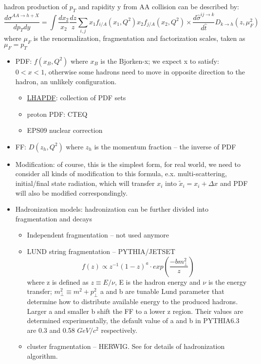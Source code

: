 hadron production of $p_T$ and rapidity y from AA collision can be described by:
\begin{equation*}
\frac{d\sigma^{AA\rightarrow h + X}}{dp_T dy} = 
    \int \frac{dx_2}{x_2}\frac{dz}{z} \sum_{i,j}x_1 f_{i/A}(x_1, Q^2)x_2 f_{j/A}(x_2, Q^2)
    \times \frac{d\hat{\sigma}^{ij\rightarrow k}}{d\hat{t}}D_{k\rightarrow h}(z, \mu_F^2)
\end{equation*}
where $\mu_F$ is the renormalization, fragmentation and factorization scales,
taken as $\mu_F = p_T$
\begin{itemize}
    \item PDF: $f(x_B, Q^2)$ where $x_B$ is the Bjorken-x; we expect x to satisfy:
	$ 0 < x < 1$, otherwise some hadrons need to move in opposite direction
	to the hadron, an unlikely configuration.
	\begin{itemize}
	    \item \href{https://lhapdf.hepforge.org/pdfsets.html}{LHAPDF}: 
		collection of PDF sets
	    \item proton PDF: CTEQ
	    \item EPS09 nuclear correction
	\end{itemize}
    \item FF: $D(z_h, Q^2)$ where $z_h$ is the momentum fraction -- the inverse
	of PDF
    \item Modification: of course, this is the simplest form, for real world,
	we need to consider all kinds of modification to this formula, e.x. 
	multi-scattering, initial/final state radiation, which will transfer
	$x_i$ into $\tilde{x}_i = x_i + \Delta x$ and PDF will also be 
	modified correspondingly.
    \item Hadronization models: hadronization can be further divided into 
	fragmentation and decays
	\begin{itemize}
	    \item Independent fragmentation -- not used anymore
	    \item LUND string fragmentation -- PYTHIA/JETSET
		$$ f(z) \propto z^{-1}(1-z)^a \cdot exp\left( \frac{-bm^2_{\perp}}{z} \right) $$
		where z is defined as $z\equiv E/\nu$, E is the hadron energy and
		$\nu$ is the energy transfer; $m^2_\perp \equiv m^2 + p^2_\perp $
		a and b are tunable Lund parameter that determine how to distribute
		available energy to the produced hadrons. Larger a and smaller b 
		shift the FF to a lower z region. Their values are determined
		experimentally, the default value of a and b in PYTHIA6.3 are 
		0.3 and 0.58 $GeV/c^2$ respectively.
	    \item cluster fragmentation -- HERWIG. See \cite{Duncan2019}
		for details of hadronization algorithm.
	\end{itemize}
\end{itemize}

